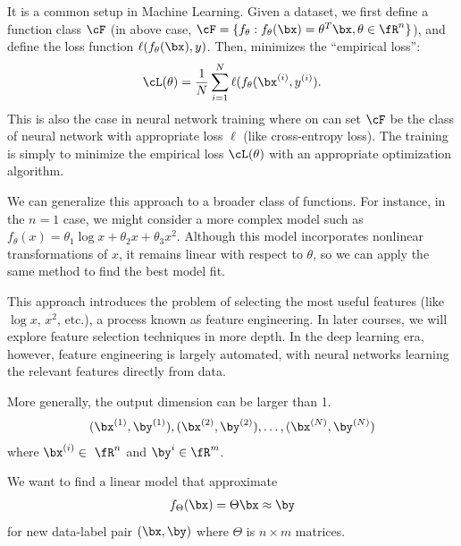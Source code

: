 \documentclass{article}
\begin{document}
\begin{remark}
    It is a common setup in Machine Learning.
    Given a dataset, we first define a function class $\cF$ (in above case, $\cF = \{f_{\theta}:f_{\theta}(\bx) = \theta^T \bx, \theta\in\fR^n\}$),
    and define the loss function $\ell(f_\theta(\bx), y)$.
    Then, minimizes the ``empirical loss'':
    \begin{align}
        \cL (\theta) = \frac{1}{N} \sum_{i=1}^N \ell(f_{\theta}(\bx^{(i)}, y^{(i)}).
    \end{align}
    This is also the case in neural network training where on can set $\cF$ be the class of neural network 
    with appropriate loss $\ell$ (like cross-entropy loss).
    The training is simply to minimize the empirical loss $\cL(\theta)$ with an appropriate optimization algorithm.
\end{remark}

\begin{remark}
We can generalize this approach to a broader class of functions.
For instance, in the $n = 1$ case, we might consider a more complex model such as
$f_\theta(x) = \theta_1 \log x + \theta_2 x + \theta_3 x^2$.
Although this model incorporates nonlinear transformations of $x$, it remains linear with respect to $\theta$, 
so we can apply the same method to find the best model fit.

This approach introduces the problem of selecting the most useful features (like $\log x$, $x^2$, etc.),
a process known as feature engineering. 
In later courses, we will explore feature selection techniques in more depth.
In the deep learning era, however, feature engineering is largely automated,
with neural networks learning the relevant features directly from data.
\end{remark}


More generally, the output dimension can be larger than 1.
\begin{align}
    (\bx^{(1)}, \by^{(1)}), (\bx^{(2)}, \by^{(2)}), \dots,  (\bx^{(N)}, \by^{(N)})
\end{align}
where $\bx^{(i)}\in\ \fR^{n}$ and $\by^{i}\in\fR^m$.

We want to find a linear model that approximate 
\begin{align}
    f_{\Theta}(\bx) = \Theta \bx\approx \by
\end{align}
for new data-label pair $(\bx, \by)$ where $\Theta$ is $n\times m$ matrices.
\end{document}
